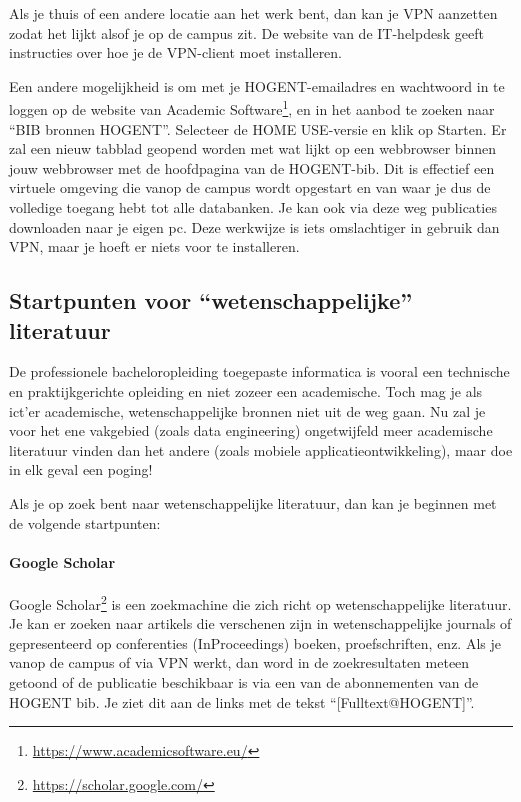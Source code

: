 Als je thuis of een andere locatie aan het werk bent, dan kan je VPN aanzetten zodat het lijkt alsof je op de campus zit. De website van de IT-helpdesk geeft instructies over hoe je de VPN-client moet installeren.

Een andere mogelijkheid is om met je HOGENT-emailadres en wachtwoord in te loggen op de website van Academic Software\footnote{\url{https://www.academicsoftware.eu/}}, en in het aanbod te zoeken naar ``BIB bronnen HOGENT''. Selecteer de HOME USE-versie en klik op Starten. Er zal een nieuw tabblad geopend worden met wat lijkt op een webbrowser binnen jouw webbrowser met de hoofdpagina van de HOGENT-bib. Dit is effectief een virtuele omgeving die vanop de campus wordt opgestart en van waar je dus de volledige toegang hebt tot alle databanken. Je kan ook via deze weg publicaties downloaden naar je eigen pc. Deze werkwijze is iets omslachtiger in gebruik dan VPN, maar je hoeft er niets voor te installeren.

\subsection{Startpunten voor ``wetenschappelijke'' literatuur}%
\label{ssec:startpunten-wetenschappelijke-literatuur}

De professionele bacheloropleiding toegepaste informatica is vooral een technische en praktijkgerichte opleiding en niet zozeer een academische. Toch mag je als ict'er academische, wetenschappelijke bronnen niet uit de weg gaan. Nu zal je voor het ene vakgebied (zoals data engineering) ongetwijfeld meer academische literatuur vinden dan het andere (zoals mobiele applicatieontwikkeling), maar doe in elk geval een poging!

Als je op zoek bent naar wetenschappelijke literatuur, dan kan je beginnen met de volgende startpunten:

\paragraph{Google Scholar}

Google Scholar\footnote{\url{https://scholar.google.com/}} is een zoekmachine die zich richt op wetenschappelijke literatuur. Je kan er zoeken naar artikels die verschenen zijn in wetenschappelijke journals of gepresenteerd op conferenties (InProceedings) boeken, proefschriften, enz. Als je vanop de campus of via VPN werkt, dan word in de zoekresultaten meteen getoond of de publicatie beschikbaar is via een van de abonnementen van de HOGENT bib. Je ziet dit aan de links met de tekst ``[Fulltext@HOGENT]''.


